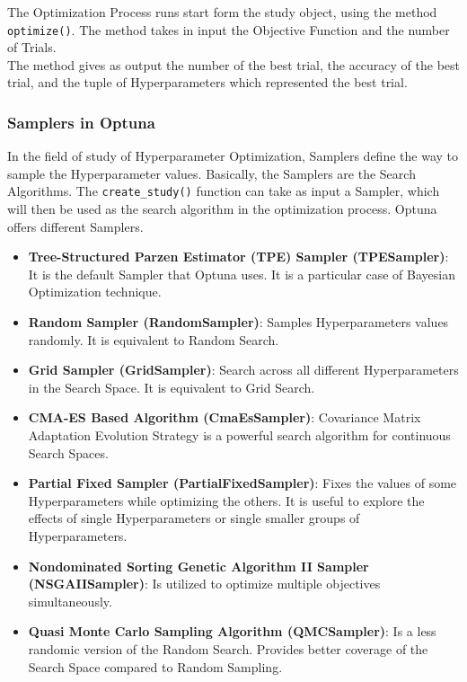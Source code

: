 The Optimization Process runs start form the study object, using the method \texttt{optimize()}.
The method takes in input the Objective Function and the number of Trials.
\\[0.3cm]The method gives as output the number of the best trial, the accuracy of the best trial, and the tuple of Hyperparameters which represented the best trial.

\subsubsection{Samplers in Optuna}

In the field of study of Hyperparameter Optimization, Samplers define the way to sample the Hyperparameter values. Basically, the Samplers are the Search Algorithms.
The \texttt{create\_study()} function can take as input a Sampler, which will then be used as the search algorithm in the optimization process.
Optuna offers different Samplers.
% 
\begin{itemize}
	\item \textbf{Tree-Structured Parzen Estimator (TPE) Sampler (TPESampler)}: It is the default Sampler that Optuna uses. It is a particular case of Bayesian Optimization technique. \cite{OptunaSamplers-TreeStructuredParzenEstimator}
	\item \textbf{Random Sampler (RandomSampler)}: Samples Hyperparameters values randomly. It is equivalent to Random Search. \cite{OptunaSamplers-RandomSearch}
	\item \textbf{Grid Sampler (GridSampler)}: Search across all different Hyperparameters in the Search Space. It is equivalent to Grid Search.
	\item \textbf{CMA-ES Based Algorithm (CmaEsSampler)}: Covariance Matrix Adaptation Evolution Strategy is a powerful search algorithm for continuous Search Spaces. \cite{OptunaSamplers-CMA-ES}
	\item \textbf{Partial Fixed Sampler (PartialFixedSampler)}: Fixes the values of some Hyperparameters while optimizing the others. It is useful to explore the effects of single Hyperparameters or single smaller groups of Hyperparameters.
	\item \textbf{Nondominated Sorting Genetic Algorithm II Sampler (NSGAIISampler)}: Is utilized to optimize multiple objectives simultaneously. \cite{OptunaSamplers-NSGAII}
	\item \textbf{Quasi Monte Carlo Sampling Algorithm (QMCSampler)}: Is a less randomic version of the Random Search. Provides better coverage of the Search Space compared to Random Sampling. \cite{OptunaSamplers-RandomSearch}
\end{itemize}
% 

